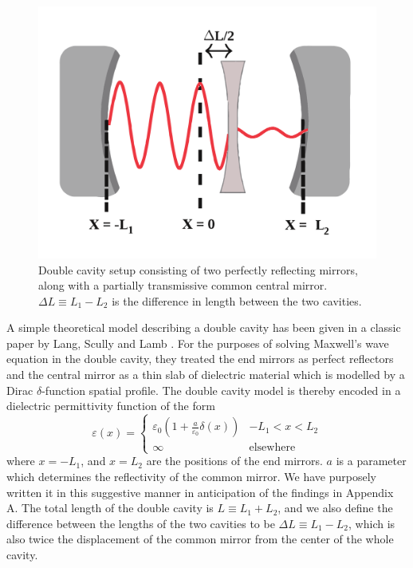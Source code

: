 \documentclass[twocolumn,english,pra,aps,superscriptaddress,floatfix]{revtex4-1}
\begin{document}
\begin{figure}
\includegraphics[width=1\columnwidth]{CavitySetupNew}
\caption{Double cavity setup consisting
of two perfectly reflecting mirrors, along with a partially transmissive common central mirror. $\Delta L \equiv L_{1}-L_{2}$ is the difference in length between the two cavities.}
\label{fig:cavitysetup}
\end{figure}

A simple theoretical model describing a double cavity has been given in a classic paper by 
Lang, Scully and Lamb \cite{lang73}. For the purposes of solving Maxwell's wave equation in the double cavity, they treated the end mirrors as perfect reflectors and the central mirror as a thin slab of dielectric material which is modelled by a Dirac $\delta$-function spatial profile. The double cavity model is thereby encoded in a dielectric permittivity function of the form
 \begin{equation}
\varepsilon(x)=\begin{cases}
\varepsilon_{0}(1+\frac{a}{\varepsilon_{0}} \delta(x)) & -L_{1}<x<L_{2}\\
\infty & \mbox{elsewhere}\end{cases}
\label{perm}
\end{equation}
where $x=-L_{1}$, and $x=L_{2}$ are the positions of the end mirrors. $a$ is a parameter which determines the reflectivity of the common mirror.  We have purposely written it in this suggestive manner in anticipation of the findings in Appendix A. The total length of the double cavity is $L \equiv L_{1}+L_{2}$, and we also define the difference between the lengths of the two cavities to be $\Delta L \equiv L_{1}-L_{2}$,  which is also twice the displacement of the common mirror from the center of the whole cavity. 
\end{document}
